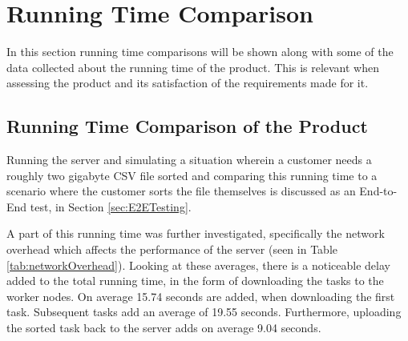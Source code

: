 \section{Running Time Comparison} \label{sec:runningTime}

In this section running time comparisons will be shown along with some of the data collected about the running time of the product. This is relevant when assessing the product and its satisfaction of the requirements made for it.

\subsection{Running Time Comparison of the Product}

Running the server and simulating a situation wherein a customer needs a roughly two gigabyte CSV file sorted and comparing this running time to a scenario where the customer sorts the file themselves is discussed as an End-to-End test, in Section \ref{sec:E2ETesting}.

A part of this running time was further investigated, specifically the network overhead which affects the performance of the server (seen in Table \ref{tab:networkOverhead}). Looking at these averages, there is a noticeable delay added to the total running time, in the form of downloading the tasks to the worker nodes. On average 15.74 seconds are added, when downloading the first task. Subsequent tasks add an average of 19.55 seconds. Furthermore, uploading the sorted task back to the server adds on average 9.04 seconds.

